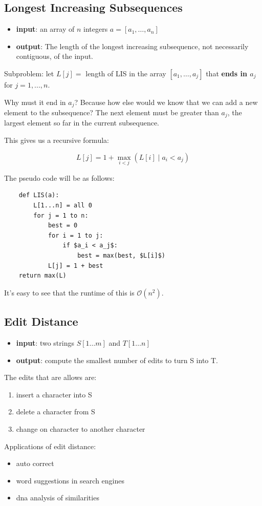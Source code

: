 \documentclass[12pt]{article}
\renewcommand{\O}{\mathcal{O}}
\begin{document}
\subsection{Longest Increasing Subsequences}
\begin{itemize}
    \item \textbf{input}: an array of $n$ integers $a = [a_1, \dots, a_n]$
    \item \textbf{output}: The length of the longest increasing subsequence, not necessarily contiguous, of the input.
\end{itemize}
Subproblem: let $L[j] =$ length of LIS in the array $[a_1, \dots, a_j]$ that \textbf{ends in $a_j$} for $j = 1, ..., n$.

Why must it end in $a_j$? Because how else would we know that we can add a new element to the subsequence? The next element must be greater than $a_j$, the largest element so far in the current subsequence.

This gives us a recursive formula:

$$
    L[j] = 1 + \max\limits_{i < j}(L[i]  \mid a_i < a_j)
$$

The pseudo code will be as follows:
\begin{lstlisting}
    def LIS(a):
        L[1...n] = all 0
        for j = 1 to n:
            best = 0
            for i = 1 to j:
                if $a_i < a_j$:
                    best = max(best, $L[i]$)
            L[j] = 1 + best
    return max(L)
\end{lstlisting}
It's easy to see that the runtime of this is $\O(n^2)$.

\subsection{Edit Distance}
\begin{itemize}
    \item \textbf{input}: two strings $S[1\dots m]$ and $T[1\dots n]$
    \item \textbf{output}: compute the smallest number of edits to turn S into T.
\end{itemize}
The edits that are allows are:
\begin{enumerate}
    \item insert a character into S
    \item delete a character from S
    \item change on character to another character
\end{enumerate}
Applications of edit distance:
\begin{itemize}
    \item auto correct
    \item word suggestions in search engines
    \item dna analysis of similarities
\end{itemize}
\end{document}
